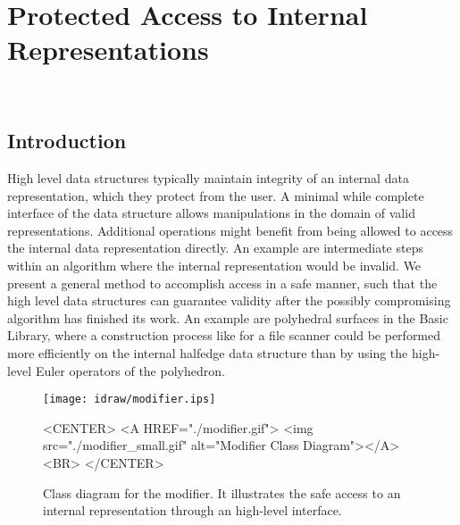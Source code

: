 
\beforecprogskip\medskipamount
\aftercprogskip\medskipamount
\ccParDims

\chapter{Protected Access to Internal Representations}
\label{chapterModifier}
\\

\section{Introduction}

High level data structures typically maintain integrity of an internal
data representation, which they protect from the user. A minimal while
complete interface of the data structure allows manipulations in the
domain of valid representations. Additional operations might benefit
from being allowed to access the internal data representation
directly. An example are intermediate steps within an algorithm where
the internal representation would be invalid. We present a general
method to accomplish access in a safe manner, such that the high level
data structures can guarantee validity after the possibly compromising
algorithm has finished its work. An example are polyhedral surfaces in
the Basic Library, where a construction process like for
a file scanner could be performed more efficiently on the internal
halfedge data structure than by using the high-level Euler operators
of the polyhedron.

\begin{figure}
\begin{ccTexOnly}
    \begin{center}
      \parbox{\textwidth}{%
          \texttt{[image: idraw/modifier.ips]}%
      }
    \end{center}
\end{ccTexOnly}

    \caption{Class diagram for the modifier. It illustrates the
             safe access to an internal representation through an
             high-level interface.
    \label{figureModifierDesign}}

\begin{ccHtmlOnly}
    <CENTER>
    <A HREF="./modifier.gif">
        <img src="./modifier_small.gif" alt="Modifier Class Diagram"></A><BR>
    </CENTER>
\end{ccHtmlOnly}
\end{figure}

